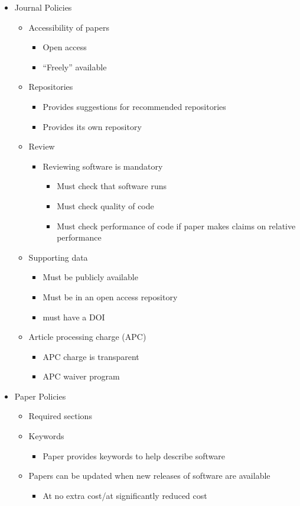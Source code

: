 \documentclass[11pt, oneside]{amsart}
\begin{document}
\begin{itemize}
\item Journal Policies
\begin{itemize}
	\item Accessibility of papers
	\begin{itemize}
		\item Open access
		\item ``Freely'' available
	\end{itemize}
	\item Repositories
	\begin{itemize}
		\item Provides suggestions for recommended repositories
		\item Provides its own repository
	\end{itemize}
	\item Review
	\begin{itemize}
		\item Reviewing software is mandatory
		\begin{itemize}
			\item Must check that software runs
			\item Must check quality of code
			\item Must check performance of code if paper makes claims on relative performance
		\end{itemize}
	\end{itemize}	
	\item Supporting data
	\begin{itemize}
		\item Must be publicly available
		\item Must be in an open access repository
		\item must have a DOI
	\end{itemize}
	\item Article processing charge (APC)
	\begin{itemize}
		\item APC charge is transparent
		\item APC waiver program
	\end{itemize}
\end{itemize}

\item Paper Policies
\begin{itemize}
	\item Required sections
	\item Keywords
	\begin{itemize}
		\item Paper provides keywords to help describe software
	\end{itemize}
	\item Papers can be updated when new releases of software are available
	\begin{itemize}
		\item At no extra cost/at significantly reduced cost
	\end{itemize}
\end{itemize}


\end{itemize}
\end{document}
